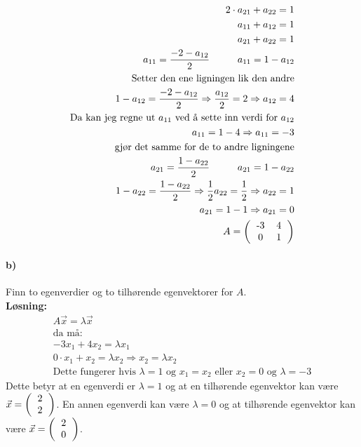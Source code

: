 \documentclass[11pt, A4paper,norsk]{article}
\begin{document}
\begin{flushleft}
\begin{align}
2 \cdot a_{21} + a_{22} = 1 \\
a_{11} + a_{12} = 1 \\
a_{21} + a_{22} = 1 \\
a_{11} = \frac{-2 - a_{12}}{2} \hspace{10mm} a_{11} = 1 - a_{12} \\
\text{Setter den ene ligningen lik den andre} \nonumber \\
1 - a_{12} = \frac{-2 - a_{12}}{2} \Rightarrow \frac{a_{12}}{2} = 2 \Rightarrow a_{12} = 4 \\
\text{Da kan jeg regne ut $a_{11}$ ved å sette inn verdi for $a_{12}$} \nonumber \\
a_{11}  = 1 - 4 \Rightarrow a_{11} = -3 \\
\text{gjør det samme for de to andre ligningene} \nonumber \\
a_{21} = \frac{1 - a_{22}}{2} \hspace{10mm} a_{21} = 1 - a_{22} \\
1 - a_{22} = \frac{1 - a_{22}}{2} \Rightarrow \frac{1}{2}a_{22} = \frac{1}{2} \Rightarrow a_{22} = 1 \\
a_{21} = 1 - 1 \Rightarrow a_{21} = 0 \\
A = 
\left(\begin{tabular}{ c c }
-3 & 4 \\
0 & 1
\end{tabular} \right)
				\end{align}
			\end{flushleft}
		\paragraph{b)}
			\begin{flushleft}
Finn to egenverdier og to tilhørende egenvektorer for $A$. \\
\vspace{1mm}
\textbf{Løsning:} \\
\vspace{1mm}
				\begin{align}
A\vec{x} = \lambda\vec{x} \\
\text{da må:} \nonumber \\
-3x_1 + 4x_2 = \lambda x_1 \\
0 \cdot x_1 + x_2 = \lambda x_2 \Rightarrow x_2 = \lambda x_2 \\
\text{Dette fungerer hvis $\lambda = 1$ og $x_1 = x_2$ eller $x_2 = 0$ og $\lambda = -3$}
				\end{align}
Dette betyr at en egenverdi er $\lambda = 1$ og at en tilhørende egenvektor kan være $\vec{x} = 
\left(\begin{tabular}{ c }
2 \\
2
\end{tabular} \right)$. En annen egenverdi kan være $\lambda = 0$ og at tilhørende egenvektor kan være $\vec{x} = 
\left(\begin{tabular}{ c }
2 \\
0
\end{tabular} \right)$.
			\end{flushleft}
\end{document}
